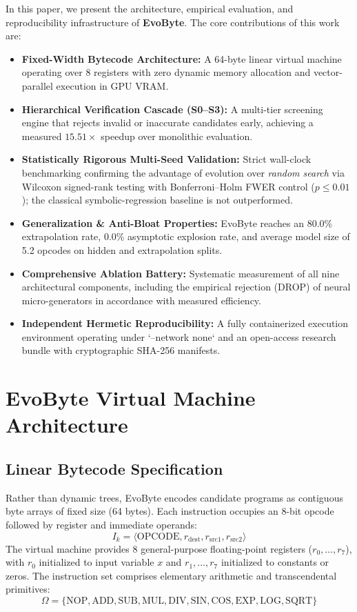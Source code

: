 \documentclass[11pt,a4paper]{article}
\begin{document}
In this paper, we present the architecture, empirical evaluation, and reproducibility infrastructure of \textbf{EvoByte}. The core contributions of this work are:
\begin{itemize}
    \item \textbf{Fixed-Width Bytecode Architecture:} A 64-byte linear virtual machine operating over 8 registers with zero dynamic memory allocation and vector-parallel execution in GPU VRAM.
    \item \textbf{Hierarchical Verification Cascade (S0--S3):} A multi-tier screening engine that rejects invalid or inaccurate candidates early, achieving a measured $15.51\times$ speedup over monolithic evaluation.
    \item \textbf{Statistically Rigorous Multi-Seed Validation:} Strict wall-clock benchmarking confirming the advantage of evolution over \emph{random search} via Wilcoxon signed-rank testing with Bonferroni--Holm FWER control ($p \le 0.01$); the classical symbolic-regression baseline is not outperformed.
    \item \textbf{Generalization \& Anti-Bloat Properties:} EvoByte reaches an 80.0\% extrapolation rate, 0.0\% asymptotic explosion rate, and average model size of 5.2 opcodes on hidden and extrapolation splits.
    \item \textbf{Comprehensive Ablation Battery:} Systematic measurement of all nine architectural components, including the empirical rejection (DROP) of neural micro-generators in accordance with measured efficiency.
    \item \textbf{Independent Hermetic Reproducibility:} A fully containerized execution environment operating under `--network none` and an open-access research bundle with cryptographic SHA-256 manifests.
\end{itemize}

\section{EvoByte Virtual Machine Architecture}

\subsection{Linear Bytecode Specification}
Rather than dynamic trees, EvoByte encodes candidate programs as contiguous byte arrays of fixed size (64 bytes). Each instruction occupies an 8-bit opcode followed by register and immediate operands:
\begin{equation}
    I_k = \langle \text{OPCODE}, r_{\text{dest}}, r_{\text{src1}}, r_{\text{src2}} \rangle
\end{equation}
The virtual machine provides 8 general-purpose floating-point registers ($r_0, \dots, r_7$), with $r_0$ initialized to input variable $x$ and $r_1, \dots, r_7$ initialized to constants or zeros. The instruction set comprises elementary arithmetic and transcendental primitives:
\begin{equation}
    \Omega = \{\text{NOP}, \text{ADD}, \text{SUB}, \text{MUL}, \text{DIV}, \text{SIN}, \text{COS}, \text{EXP}, \text{LOG}, \text{SQRT}\}
\end{equation}
\end{document}
